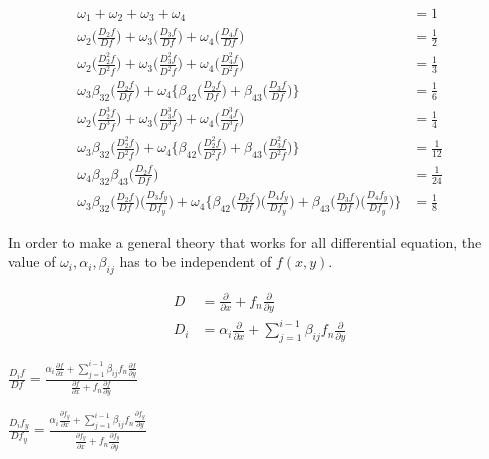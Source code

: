 \documentclass[12 pt]{article}
\begin{document}
	\begin{align*}
		\omega_{1} + \omega_{2} + \omega_{3} + \omega_{4} &= 1\\
		\omega_{2}\bigg(\frac{D_{2}f}{Df}\bigg) + \omega_{3}\bigg(\frac{D_{3}f}{Df}\bigg) + \omega_{4}\bigg(\frac{D_{4}f}{Df}\bigg) &= \frac{1}{2}\\
		\omega_{2}\bigg(\frac{D_{2}^{2}f}{D^{2}f}\bigg) + \omega_{3}\bigg(\frac{D_{3}^{2}f}{D^{2}f}\bigg) + \omega_{4}\bigg(\frac{D_{4}^{2}f}{D^{2}f}\bigg) &= \frac{1}{3}\\
		\omega_{3}\beta_{32}\bigg(\frac{D_{2}f}{Df}\bigg) + \omega_{4}\bigg\{\beta_{42}\bigg(\frac{D_{2}f}{Df}\bigg) + 
		\beta_{43}\bigg(\frac{D_{3}f}{Df}\bigg)\bigg\} &= \frac{1}{6}\\
		\omega_{2}\bigg(\frac{D_{2}^{3}f}{D^{3}f}\bigg) + 
		\omega_{3}\bigg(\frac{D_{3}^{3}f}{D^{3}f}\bigg) + 
		\omega_{4}\bigg(\frac{D_{4}^{3}f}{D^{3}f}\bigg) &= \frac{1}{4}\\
		\omega_{3}\beta_{32}\bigg(\frac{D_{2}^{2}f}{D^{2}f}\bigg) + \omega_{4}\bigg\{\beta_{42}\bigg(\frac{D_{2}^{2}f}{D^{2}f}\bigg) +
		\beta_{43}\bigg(\frac{D_{3}^{2}f}{D^{2}f}\bigg)\bigg\} &= \frac{1}{12}\\
		\omega_{4}\beta_{32}\beta_{43}\bigg(\frac{D_{2}f}{Df}\bigg) &= \frac{1}{24}\\
		\omega_{3}\beta_{32}\bigg(\frac{D_{2}f}{Df}\bigg)\bigg(\frac{D_{3}f_{y}}{Df_{y}}\bigg) + 
		\omega_{4}\bigg\{\beta_{42}\bigg(\frac{D_{2}f}{Df}\bigg)\bigg(\frac{D_{4}f_{y}}{Df_{y}}\bigg) + 
		\beta_{43}\bigg(\frac{D_{3}f}{Df}\bigg)\bigg(\frac{D_{4}f_{y}}{Df_{y}}\bigg)\bigg\} &= \frac{1}{8}
	\end{align*}
	
	In order to make a general theory that works for all differential equation, the value of $\omega_{i}, \alpha_{i}, \beta_{ij}$ has to be independent of $f(x,y)$.
	
	\begin{align*}
		D &= \frac{\partial}{\partial x} + f_{n}\frac{\partial}{\partial y}\\
		D_{i}&= \alpha_{i}\frac{\partial }{\partial x} + \sum_{j=1}^{i-1}\beta_{ij}f_{n}\frac{\partial }{\partial y}
	\end{align*}
	
	$\frac{D_{i}f}{Df} = \frac{\alpha_{i}\frac{\partial f}{\partial x} + \sum_{j=1}^{i-1}\beta_{ij}f_{n}\frac{\partial f}{\partial y}}{\frac{\partial f}{\partial x} + f_{n}\frac{\partial f}{\partial y}}$
	
	$\frac{D_{i}f_{y}}{Df_{y}} = \frac{\alpha_{i}\frac{\partial f_{y}}{\partial x} + \sum_{j=1}^{i-1}\beta_{ij}f_{n}\frac{\partial f_{y}}{\partial y}}{\frac{\partial f_{y}}{\partial x} + f_{n}\frac{\partial f_{y}}{\partial y}}$
	
\end{document}
